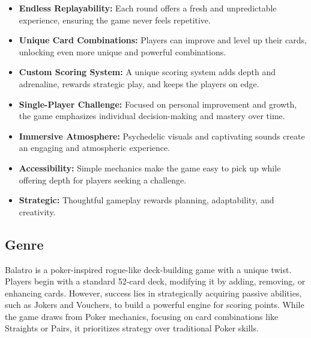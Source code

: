 \documentclass[a4paper,10pt,english]{article}
\begin{document}
\begin{itemize}
    \item \textbf{Endless Replayability:} Each round offers a fresh and unpredictable experience, ensuring the game never feels repetitive.
    \item \textbf{Unique Card Combinations:} Players can improve and level up their cards, unlocking even more unique and powerful combinations.
    \item \textbf{Custom Scoring System:} A unique scoring system adds depth and adrenaline, rewards strategic play, and keeps the players on edge.
    \item \textbf{Single-Player Challenge:} Focused on personal improvement and growth, the game emphasizes individual decision-making and mastery over time.
    \item \textbf{Immersive Atmosphere:} Psychedelic visuals and captivating sounds create an engaging and atmospheric experience.
    \item \textbf{Accessibility:} Simple mechanics make the game easy to pick up while offering depth for players seeking a challenge.
    \item \textbf{Strategic:} Thoughtful gameplay rewards planning, adaptability, and creativity.
\end{itemize}

\subsection*{Genre}



Balatro is a poker-inspired rogue-like deck-building game with a unique twist. Players begin with a standard 52-card deck, modifying it by adding, removing, or enhancing cards. However, success lies in strategically acquiring passive abilities, such as Jokers and Vouchers, to build a powerful engine for scoring points. While the game draws from Poker mechanics, focusing on card combinations like Straights or Pairs, it prioritizes strategy over traditional Poker skills.
\end{document}
